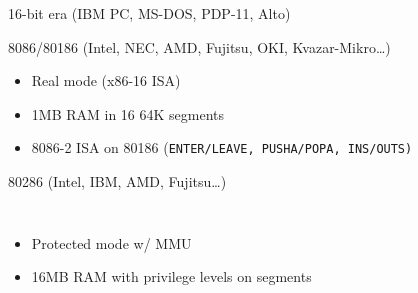 \documentclass[xcolor={dvipsnames,table}]{beamer}
\begin{document}
\begin{frame}[t]{16-bit era (IBM PC, MS-DOS, PDP-11, Alto)}
\begin{block}{8086/80186 (Intel, NEC, AMD, Fujitsu, OKI, Kvazar-Mikro\ldots)}
\begin{itemize}
\item Real mode (x86-16 ISA)
\item 1MB RAM in 16 64K segments
\item 8086-2 ISA on 80186
{\footnotesize
(\tt{ENTER}/\tt{LEAVE}, \tt{PUSHA}/\tt{POPA}, \tt{INS}/\tt{OUTS})
}
\end{itemize}
\end{block}
\begin{block}{80286 (Intel, IBM, AMD, Fujitsu\ldots)}
\begin{columns}
\column{3.4in}
\begin{itemize}
\item Protected mode w/ MMU
\item 16MB RAM with privilege levels on segments
\end{itemize}
\column{.5in}
\end{columns}
\end{block}
\vfill
\begin{center}
\end{center}
\end{frame}
\end{document}
